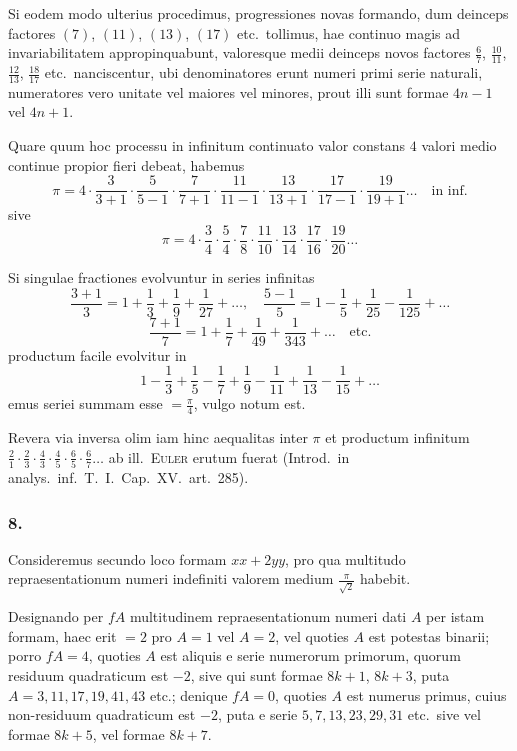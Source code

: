 \documentclass[12pt,a4paper]{article}
\begin{document}
Si eodem modo ulterius procedimus, progressiones novas formando, dum deinceps factores $(7)$, $(11)$, $(13)$, $(17)$ etc.\ tollimus, hae continuo magis ad invariabilitatem appropinquabunt, valoresque medii deinceps novos factores $\frac{6}{7}$, $\frac{10}{11}$, $\frac{12}{13}$, $\frac{18}{17}$ etc.\ nanciscentur, ubi denominatores erunt numeri primi serie naturali, numeratores vero unitate vel maiores vel minores, prout illi sunt formae $4n-1$ vel $4n+1$.

Quare quum hoc processu in infinitum continuato valor constans $4$ valori medio continue propior fieri debeat, habemus
\[
\pi = 4\cdot\frac{3}{3+1}\cdot\frac{5}{5-1}\cdot\frac{7}{7+1}\cdot\frac{11}{11-1}\cdot\frac{13}{13+1}\cdot\frac{17}{17-1}\cdot\frac{19}{19+1}\ldots\quad\text{in inf.}
\]
sive
\[
\pi = 4\cdot\frac{3}{4}\cdot\frac{5}{4}\cdot\frac{7}{8}\cdot\frac{11}{10}\cdot\frac{13}{14}\cdot\frac{17}{16}\cdot\frac{19}{20}\ldots
\]

Si singulae fractiones evolvuntur in series infinitas
\[
\frac{3+1}{3} = 1 + \frac{1}{3} + \frac{1}{9} + \frac{1}{27} + \ldots, \quad \frac{5-1}{5} = 1 - \frac{1}{5} + \frac{1}{25} - \frac{1}{125} + \ldots
\]
\[
\frac{7+1}{7} = 1 + \frac{1}{7} + \frac{1}{49} + \frac{1}{343} + \ldots \quad\text{etc.}
\]
productum facile evolvitur in
\[
1 - \frac{1}{3} + \frac{1}{5} - \frac{1}{7} + \frac{1}{9} - \frac{1}{11} + \frac{1}{13} - \frac{1}{15} + \ldots
\]
emus seriei summam esse $=\frac{\pi}{4}$, vulgo notum est.

Revera via inversa olim iam hinc aequalitas inter $\pi$ et productum infinitum $\frac{2}{1}\cdot\frac{2}{3}\cdot\frac{4}{3}\cdot\frac{4}{5}\cdot\frac{6}{5}\cdot\frac{6}{7}\ldots$ ab ill.\ \textsc{Euler} erutum fuerat (Introd.\ in analys.\ inf.\ T.\ I.\ Cap.\ XV.\ art.\ 285).

\subsubsection*{8.}

Consideremus secundo loco formam $xx+2yy$, pro qua multitudo repraesentationum numeri indefiniti valorem medium $\frac{\pi}{\sqrt{2}}$ habebit.

Designando per $fA$ multitudinem repraesentationum numeri dati $A$ per istam formam, haec erit $=2$ pro $A=1$ vel $A=2$, vel quoties $A$ est potestas binarii; porro $fA=4$, quoties $A$ est aliquis e serie numerorum primorum, quorum residuum quadraticum est $-2$, sive qui sunt formae $8k+1$, $8k+3$, puta $A=3, 11, 17, 19, 41, 43$ etc.; denique $fA=0$, quoties $A$ est numerus primus, cuius non-residuum quadraticum est $-2$, puta e serie $5, 7, 13, 23, 29, 31$ etc.\ sive vel formae $8k+5$, vel formae $8k+7$.
\end{document}
